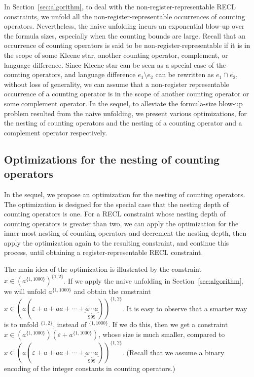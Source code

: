 
In Section~\ref{sec:algorithm}, to deal with the non-register-representable RECL constraints, we unfold all the non-register-representable occurrences of counting operators. Nevertheless, 
the naive unfolding incurs an exponential blow-up over the formula sizes, especially when the counting bounds are large. 
Recall that an occurrence of counting operators is said to be non-register-representable if it is in the scope of some Kleene star, another counting operator, complement, or language difference. Since Kleene star can be seen as a special case of the counting operators, and language difference $e_1 \setminus e_2$ can be rewritten as $e_1 \cap \overline{e_2}$, without loss of generality, we can assume that a non-register representable occurrence of a  counting operator is in the scope of another counting operator or some complement operator. 
In the sequel, to alleviate the formula-size blow-up problem resulted from the naive unfolding, we present various optimizations, for the nesting of counting operators and the nesting of a counting operator and a complement operator respectively. 

\subsection{Optimizations for the nesting of counting operators}\label{heuristic:nested}

In the sequel, we propose an optimization for the nesting of counting operators. 
The optimization is designed for the special case that the nesting depth of counting operators is one. For a RECL constraint whose nesting depth of counting operators is greater than two, we can apply the optimization for the inner-most nesting of counting operators and decrement the nesting depth, then apply the optimization again to the resulting constraint, and continue this process, until obtaining a register-representable RECL constraint.  

The main idea of the optimization is illustrated by the constraint $x \in (a^{\{1,1000\}})^{\{1,2\}}$. If we apply the naive unfolding in Section~\ref{sec:algorithm}, we will unfold  $a^{\{1,1000\}}$ and obtain the constraint $x \in (a(\varepsilon + a + aa + \cdots + \underbrace{a\cdots a}_{999}))^{\{1,2\}}$. It is easy to observe that a smarter way is to unfold  $^{\{1,2\}}$, instead of $^{\{1, 1000\}}$.  If we do this, then we get a constraint $x \in (a^{\{1,1000\}})(\varepsilon + a^{\{1,1000\}})$, whose size is much smaller, compared to $x \in (a(\varepsilon + a + aa + \cdots + \underbrace{a\cdots a}_{999}))^{\{1,2\}}$. (Recall that we assume a binary encoding of the integer constants in counting operators.)

